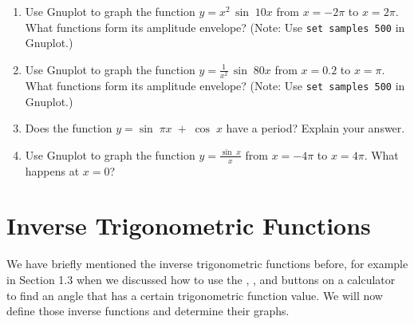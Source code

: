 {\begin{enumerate}[\bfseries 1.]
  You can think of this function as $\sin\;12x$ with a sinusoidally varying ``amplitude''of
  $0.5\,\sin\;x$. What is the period of this function?
  From the graph it looks like the amplitude may be $0.5$.
  Without finding the exact amplitude, explain why the amplitude is in fact \emph{less} than $0.5$.
  The function above is known as a \emph{modulated wave}, and the functions
  $\pm\,0.5\,\sin\;x$ form an \emph{amplitude envelope} for the wave (i.e.
  they enclose the wave). Use an identity from Section 3.4 to write this function as a sum of
  sinusoidal curves.
 \item Use Gnuplot to graph the function $y= x^2 \,\sin\;10x$ from $x = -2\pi$ to $x=2\pi$. What
  functions form its amplitude envelope? (Note: Use \texttt{set samples 500} in Gnuplot.)
 \item Use Gnuplot to graph the function $y= \frac{1}{x^2} \,\sin\;80x$ from $x = 0.2$ to $x=\pi$.
  What functions form its amplitude envelope? (Note: Use \texttt{set samples 500} in Gnuplot.)
 \item Does the function $y=\sin\;\pi x \;+\; \cos\;x$ have a period? Explain your answer.
 \item Use Gnuplot to graph the function $y=\frac{\sin\;x}{x}$ from $x=-4\pi$ to $x=4\pi$. What
  happens at $x=0$?
\end{enumerate}}
\newpage
\section{Inverse Trigonometric Functions}
We have briefly mentioned the inverse trigonometric functions before, for example in Section 1.3
when we discussed how to use the {\setlength\fboxsep{1pt}},
{\setlength\fboxsep{1pt}}, and
{\setlength\fboxsep{1pt}} buttons on a calculator to find
an angle that has a certain trigonometric function value. We will now define those inverse
functions and determine their graphs.

